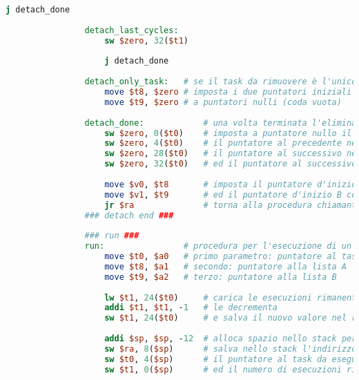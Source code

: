 \begin{center}
\begin{lstlisting}[language=mips, gobble=14, stepnumber=1]
                    j detach_done
                    
                detach_last_cycles:
                    sw $zero, 32($t1)
                
                    j detach_done
                    
                detach_only_task:   # se il task da rimuovere è l'unico presente nelle due code
                    move $t8, $zero # imposta i due puntatori iniziali delle liste A e B
                    move $t9, $zero # a puntatori nulli (coda vuota)
                    
                detach_done:            # una volta terminata l'eliminazione dalle due liste
                    sw $zero, 0($t0)    # imposta a puntatore nullo il precedente, nella lista A, del task rimosso
                    sw $zero, 4($t0)    # il puntatore al precedente nella lista B
                    sw $zero, 28($t0)   # il puntatore al successivo nella lista A
                    sw $zero, 32($t0)   # ed il puntatore al successivo nella lista B
                
                    move $v0, $t8       # imposta il puntatore d'inizio A come primo valore di ritorno
                    move $v1, $t9       # ed il puntatore d'inizio B come secondo valore di ritorno
                    jr $ra              # torna alla procedura chiamante
                ### detach end ###
                
                ### run ###
                run:                # procedura per l'esecuzione di un task
                    move $t0, $a0   # primo parametro: puntatore al task da eseguire
                    move $t8, $a1   # secondo: puntatore alla lista A
                    move $t9, $a2   # terzo: puntatore alla lista B
                    
                    lw $t1, 24($t0)     # carica le esecuzioni rimanenti del task
                    addi $t1, $t1, -1   # le decrementa
                    sw $t1, 24($t0)     # e salva il nuovo valore nel record del task
                    
                    addi $sp, $sp, -12  # alloca spazio nello stack per 12 byte (3 word)
                    sw $ra, 8($sp)      # salva nello stack l'indirizzo di ritorno
                    sw $t0, 4($sp)      # il puntatore al task da eseguire
                    sw $t1, 0($sp)      # ed il numero di esecuzioni rimanenti dopo la sua esecuzione
                    

\end{lstlisting}
\end{center}
